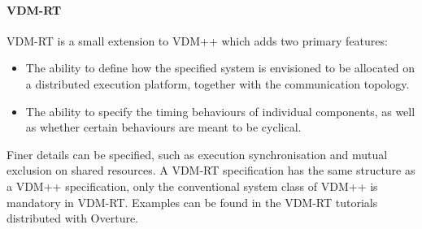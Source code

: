 \paragraph{VDM-RT}
VDM-RT is a small extension to VDM++ which adds two primary features:
%
%
%
\begin{itemize}
%
\item  The ability to define how the specified system is envisioned to be allocated on a distributed execution platform, together with the communication topology.
%
\item  The ability to specify the timing behaviours of individual components, as well as whether certain behaviours are meant to be cyclical.
%
\end{itemize}
%
Finer details can be specified, such as execution synchronisation and mutual exclusion on shared resources.
%
A VDM-RT specification has the same structure as a VDM++ specification, only the conventional system class of VDM++ is mandatory in VDM-RT.
%
Examples can be found in the VDM-RT tutorials distributed with Overture.
%
%
%
